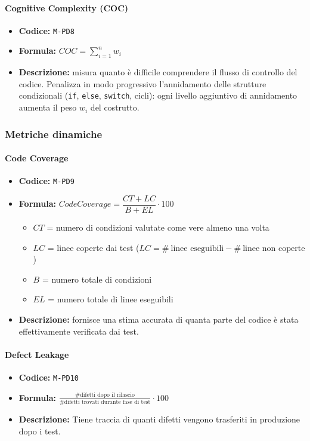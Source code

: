 \documentclass[a4paper,12pt]{article}
\begin{document}
\paragraph{Cognitive Complexity (COC)}
\begin{itemize}
\item \textbf{Codice:} \texttt{M-PD8}
\item \textbf{Formula:} $COC = \sum_{i=1}^{n} w_i$
\item \textbf{Descrizione:} misura quanto è difficile comprendere il flusso di controllo 
del codice. Penalizza in modo progressivo l'annidamento delle strutture condizionali 
(\texttt{if}, \texttt{else}, \texttt{switch}, cicli): ogni livello aggiuntivo di annidamento aumenta il peso $w_i$ del costrutto.
\end{itemize}

\subsubsection{Metriche dinamiche}
\paragraph{Code Coverage}
\begin{itemize}
\item \textbf{Codice:} \texttt{M-PD9}
\item \textbf{Formula:} 
$Code Coverage = \dfrac{CT + LC}{B + EL} \cdot 100$
\begin{itemize}
    \item \textbf{$CT$} = numero di condizioni valutate come vere almeno una volta
    \item \textbf{$LC$} = linee coperte dai test 
    ($LC = \#\ \text{linee eseguibili} - \#\ \text{linee non coperte}$)
    \item \textbf{$B$} = numero totale di condizioni
    \item \textbf{$EL$} = numero totale di linee eseguibili
\end{itemize}
\item \textbf{Descrizione:} fornisce una stima accurata di quanta parte 
del codice è stata effettivamente verificata dai test.
\end{itemize}

\paragraph{Defect Leakage}
\begin{itemize}
    \item \textbf{Codice:} \texttt{M-PD10}
    \item \textbf{Formula:} $\frac{\text{\# difetti dopo il rilascio}}{\text{\# difetti trovati durante fase di test}}\cdot 100$
    \item \textbf{Descrizione:} Tiene traccia di quanti difetti vengono trasferiti in produzione dopo i test.
\end{itemize}
\end{document}
